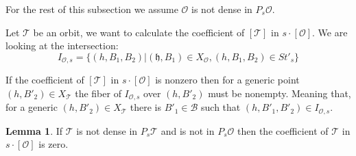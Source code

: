 \documentclass[12pt]{article}
\newcommand{\B}{\mathcal{B}}
\newcommand{\s}{\mathcal{O}}
\theoremstyle{plain}
\theoremstyle{definition}
\newtheorem{lemma}[theorem]{Lemma}
\begin{document}
For the rest of this subsection we assume $\mathcal{O}$ is not dense in $P_{s}\mathcal{O}$.

Let $\mathcal{T}$ be an orbit, we want to calculate the coefficient of $[\mathcal{T}]$ in ${s}\cdot [\mathcal{O}]$. We are looking at the intersection:
    $$ I_{\s,s}=\{(h,B_{1},B_{2})|(\mathfrak{h},B_{1})\in X_{\mathcal{O}}, (h,B_{1},B_{2})\in St'_{s}\}$$
    
If the coefficient of $[\mathcal{T}]$ in $s\cdot[\s]$ is nonzero then for a generic point $(h,B'_{2})\in X_{\mathcal{T}}$ the fiber of $I_{\s,s}$ over $(h,B'_{2})$ must be nonempty. Meaning that, for a generic $(h,B'_{2})\in X_{\mathcal{T}}$ there is $B'_1\in \B$ such that $(h,B'_1,B'_2)\in I_{\s,s}$.


\begin{lemma}
    If $\mathcal{T}$ is not dense in $P_{s}\mathcal{T}$ and is not in $P_{s}\mathcal{O}$ then the coefficient of $\mathcal{T}$ in ${s}\cdot  [\mathcal{O}]$ is zero.
\end{lemma}
\end{document}
